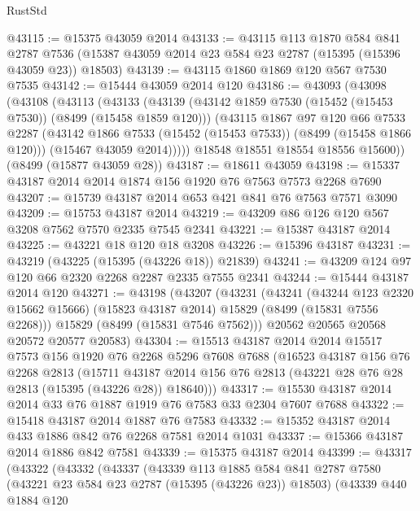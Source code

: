 \begin{lexlean}{RustStd}
\begin{coremodule}
@43115 := @15375 @43059 @2014
@43133 := @43115
    @113
    @1870
    @584
    @841
    @2787
    @7536
    (@15387 @43059 @2014 @23 @584 @23 @2787 (@15395 (@15396 @43059 @23)) @18503)
@43139 := @43115 @1860 @1869 @120 @567 @7530 @7535
@43142 := @15444 @43059 @2014 @120
@43186 := @43093
    (@43098
      (@43108
        (@43113
          (@43133
            (@43139
              (@43142 @1859 @7530 (@15452 (@15453 @7530)) (@8499 (@15458 @1859 @120)))
              (@43115
                @1867
                @97
                @120
                @66
                @7533
                @2287
                (@43142 @1866 @7533 (@15452 (@15453 @7533)) (@8499 (@15458 @1866 @120)))
                (@15467 @43059 @2014)))))
        @18548
        @18551
        @18554
        @18556
        @15600))
    (@8499 (@15877 @43059 @28))
@43187 := @18611 @43059
@43198 := @15337 @43187 @2014 @2014 @1874 @156 @1920 @76 @7563 @7573 @2268 @7690
@43207 := @15739 @43187 @2014 @653 @421 @841 @76 @7563 @7571 @3090
@43209 := @15753 @43187 @2014
@43219 := @43209 @86 @126 @120 @567 @3208 @7562 @7570 @2335 @7545 @2341
@43221 := @15387 @43187 @2014
@43225 := @43221 @18 @120 @18 @3208
@43226 := @15396 @43187
@43231 := @43219 (@43225 (@15395 (@43226 @18)) @21839)
@43241 := @43209 @124 @97 @120 @66 @2320 @2268 @2287 @2335 @7555 @2341
@43244 := @15444 @43187 @2014 @120
@43271 := @43198
    (@43207
      (@43231
        (@43241
          (@43244 @123 @2320 @15662 @15666)
          (@15823 @43187 @2014)
          @15829
          (@8499 (@15831 @7556 @2268)))
        @15829
        (@8499 (@15831 @7546 @7562)))
      @20562
      @20565
      @20568
      @20572
      @20577
      @20583)
@43304 := @15513
    @43187
    @2014
    @2014
    @15517
    @7573
    @156
    @1920
    @76
    @2268
    @5296
    @7608
    @7688
    (@16523
      @43187
      @156
      @76
      @2268
      @2813
      (@15711 @43187 @2014 @156 @76 @2813 (@43221 @28 @76 @28 @2813 (@15395 (@43226 @28)) @18640)))
@43317 := @15530 @43187 @2014 @2014 @33 @76 @1887 @1919 @76 @7583 @33 @2304 @7607 @7688
@43322 := @15418 @43187 @2014 @1887 @76 @7583
@43332 := @15352 @43187 @2014 @433 @1886 @842 @76 @2268 @7581 @2014 @1031
@43337 := @15366 @43187 @2014 @1886 @842 @7581
@43339 := @15375 @43187 @2014
@43399 := @43317
    (@43322
      (@43332
        (@43337
          (@43339
            @113
            @1885
            @584
            @841
            @2787
            @7580
            (@43221 @23 @584 @23 @2787 (@15395 (@43226 @23)) @18503)
            (@43339
              @440
              @1884
              @120

\end{coremodule}
\end{lexlean}
